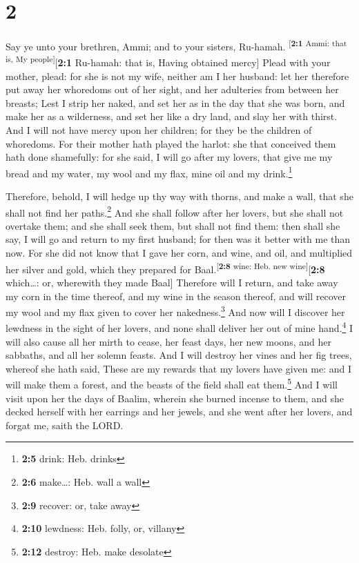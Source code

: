 \hypertarget{section-1}{%
\section{2}\label{section-1}}

 Say ye unto your brethren, Ammi; and to your sisters,
Ru-hamah. \textsuperscript{{[}\textbf{2:1} Ammi: that is, My
people{]}}{[}\textbf{2:1} Ru-hamah: that is, Having obtained mercy{]}
 Plead with your mother, plead: for she is not my wife,
neither am I her husband: let her therefore put away her whoredoms out
of her sight, and her adulteries from between her breasts;
 Lest I strip her naked, and set her as in the day that
she was born, and make her as a wilderness, and set her like a dry land,
and slay her with thirst.  And I will not have mercy upon
her children; for they be the children of whoredoms.  For
their mother hath played the harlot: she that conceived them hath done
shamefully: for she said, I will go after my lovers, that give me my
bread and my water, my wool and my flax, mine oil and my
drink.\footnote{\textbf{2:5} drink: Heb. drinks}

 Therefore, behold, I will hedge up thy way with thorns,
and make a wall, that she shall not find her paths.\footnote{\textbf{2:6}
  make\ldots: Heb. wall a wall}  And she shall follow
after her lovers, but she shall not overtake them; and she shall seek
them, but shall not find them: then shall she say, I will go and return
to my first husband; for then was it better with me than now.
 For she did not know that I gave her corn, and wine, and
oil, and multiplied her silver and gold, which they prepared for
Baal.\textsuperscript{{[}\textbf{2:8} wine: Heb. new
wine{]}}{[}\textbf{2:8} which\ldots: or, wherewith they made Baal{]}
 Therefore will I return, and take away my corn in the
time thereof, and my wine in the season thereof, and will recover my
wool and my flax given to cover her nakedness.\footnote{\textbf{2:9}
  recover: or, take away}  And now will I discover her
lewdness in the sight of her lovers, and none shall deliver her out of
mine hand.\footnote{\textbf{2:10} lewdness: Heb. folly, or, villany}
 I will also cause all her mirth to cease, her feast
days, her new moons, and her sabbaths, and all her solemn feasts.
 And I will destroy her vines and her fig trees, whereof
she hath said, These are my rewards that my lovers have given me: and I
will make them a forest, and the beasts of the field shall eat
them.\footnote{\textbf{2:12} destroy: Heb. make desolate}
 And I will visit upon her the days of Baalim, wherein
she burned incense to them, and she decked herself with her earrings and
her jewels, and she went after her lovers, and forgat me, saith the
LORD.

